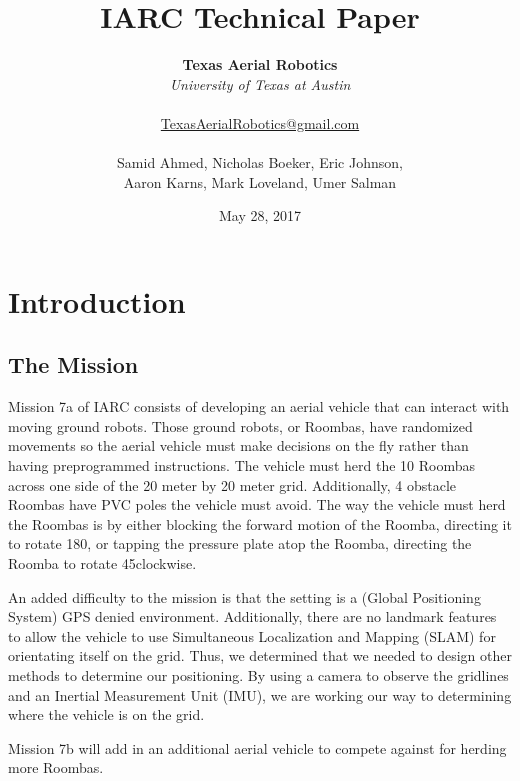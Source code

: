 \documentclass[12pt]{article}
\title{IARC Technical Paper}
\author{
	\textbf{Texas Aerial Robotics} \\ 
	\textit{University of Texas at Austin} \\ \\ 
	\href{mailto:TexasAerialRobotics@gmail.com}{TexasAerialRobotics@gmail.com} \\ \\ 
	Samid Ahmed, Nicholas Boeker, Eric Johnson, \\ Aaron Karns, Mark Loveland, Umer Salman}
\date{May 28, 2017}
\begin{document}
\maketitle
\thispagestyle{empty}


\pagebreak
\tableofcontents

\pagebreak

\section{Introduction}
\subsection{The Mission}
Mission 7a of IARC consists of developing an aerial vehicle that can interact with moving ground robots. Those ground robots, or Roombas, have randomized movements so the aerial vehicle must make decisions on the fly rather than having preprogrammed instructions. The vehicle must herd the 10 Roombas across one side of the 20 meter by 20 meter grid. Additionally, 4 obstacle Roombas have PVC poles the vehicle must avoid. The way the vehicle must herd the Roombas is by either blocking the forward motion of the Roomba, directing it to rotate 180\degree, or tapping the pressure plate atop the Roomba, directing the Roomba to rotate 45\degree clockwise. 

An added difficulty to the mission is that the setting is a (Global Positioning System) GPS denied environment. Additionally, there are no landmark features to allow the vehicle to use Simultaneous Localization and Mapping (SLAM) for orientating itself on the grid. Thus, we determined that we needed to design other methods to determine our positioning. By using a camera to observe the gridlines and an Inertial Measurement Unit (IMU), we are working our way to determining where the vehicle is on the grid. 

Mission 7b will add in an additional aerial vehicle to compete against for herding more Roombas. 
\end{document}
